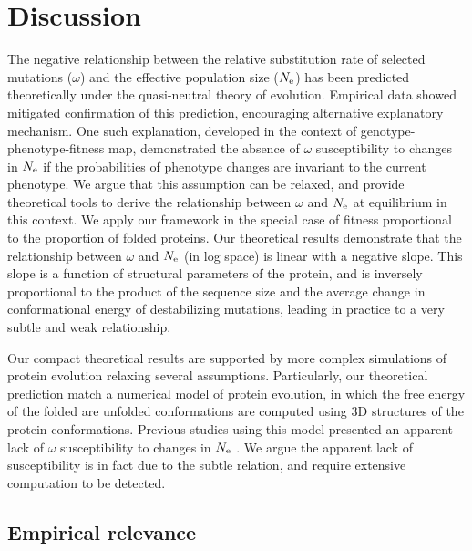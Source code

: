 \documentclass{article}
\begin{document}
	\section*{Discussion}
	The negative relationship between the relative substitution rate of selected mutations ($\omega$) and the effective population size ($N_{\mathrm{e}}$) has been predicted theoretically under the quasi-neutral theory of evolution.
	Empirical data showed mitigated confirmation of this prediction, encouraging alternative explanatory mechanism.
	One such explanation, developed in the context of genotype-phenotype-fitness map, demonstrated the absence of $\omega$ susceptibility to changes in $N_{\mathrm{e}}$ if the probabilities of phenotype changes are invariant to the current phenotype.
	We argue that this assumption can be relaxed, and provide theoretical tools to derive the relationship between $\omega$ and $N_{\mathrm{e}}$ at equilibrium in this context.
	We apply our framework in the special case of fitness proportional to the proportion of folded proteins. 
	Our theoretical results demonstrate that the relationship between $\omega$ and $N_{\mathrm{e}}$ (in log space) is linear with a negative slope.
	This slope is a function of structural parameters of the protein, and is inversely proportional to the product of the sequence size and the average change in conformational energy of destabilizing mutations, leading in practice to a very subtle and weak relationship. 


	Our compact theoretical results are supported by more complex simulations of protein evolution relaxing several assumptions.
	Particularly, our theoretical prediction match a numerical model of protein evolution, in which the free energy of the folded are unfolded conformations are computed using $3$D structures of the protein conformations.
	Previous studies using this model presented an apparent lack of $\omega$ susceptibility to changes in $N_{\mathrm{e}}$ \cite{Goldstein2013}.
	We argue the apparent lack of susceptibility is in fact due to the subtle relation, and require extensive computation to be detected.
	
	\subsection*{Empirical relevance}
\end{document}
